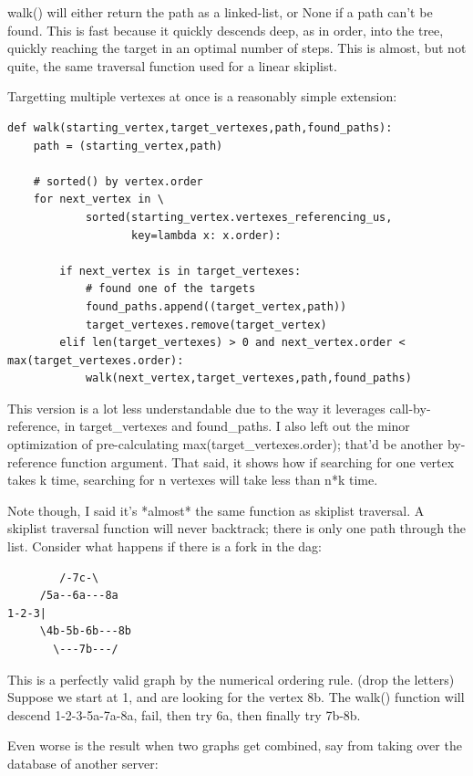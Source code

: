 \documentclass{article}
\begin{document}
walk() will either return the path as a linked-list, or None if a path
can't be found. This is fast because it quickly descends deep, as in
order, into the tree, quickly reaching the target in an optimal number
of steps. This is almost, but not quite, the same traversal function
used for a linear skiplist. 

Targetting multiple vertexes at once is a reasonably simple extension:

\begin{verbatim}
def walk(starting_vertex,target_vertexes,path,found_paths):
    path = (starting_vertex,path)

    # sorted() by vertex.order
    for next_vertex in \ 
            sorted(starting_vertex.vertexes_referencing_us,
                   key=lambda x: x.order):

        if next_vertex is in target_vertexes:
            # found one of the targets
            found_paths.append((target_vertex,path))
            target_vertexes.remove(target_vertex)
        elif len(target_vertexes) > 0 and next_vertex.order < max(target_vertexes.order):
            walk(next_vertex,target_vertexes,path,found_paths)
\end{verbatim}

This version is a lot less understandable due to the way it leverages
call-by-reference, in target\_vertexes and found\_paths. I also left out
the minor optimization of pre-calculating max(target\_vertexes.order);
that'd be another by-reference function argument. That said, it shows
how if searching for one vertex takes k time, searching for n vertexes
will take less than n*k time.


Note though, I said it's *almost* the same function as skiplist
traversal. A skiplist traversal function will never backtrack; there is
only one path through the list. Consider what happens if there is a fork
in the dag:

\begin{verbatim}
        /-7c-\
     /5a--6a---8a
1-2-3|
     \4b-5b-6b---8b
       \---7b---/
\end{verbatim}

This is a perfectly valid graph by the numerical ordering rule. (drop
the letters) Suppose we start at 1, and are looking for the vertex 8b.
The walk() function will descend 1-2-3-5a-7a-8a, fail, then try 6a, then
finally try 7b-8b. 

Even worse is the result when two graphs get combined, say from taking
over the database of another server:
\end{document}
